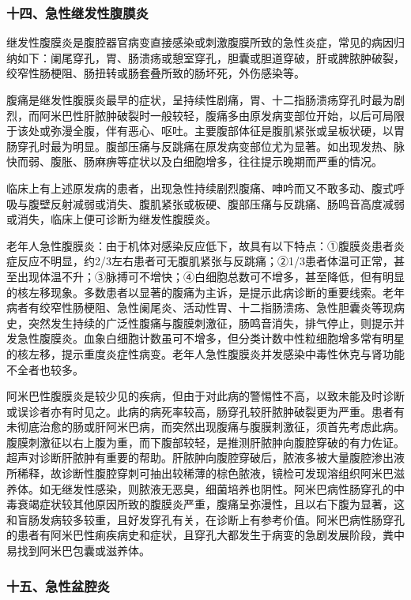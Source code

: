 \subsubsection{十四、急性继发性腹膜炎}

继发性腹膜炎是腹腔器官病变直接感染或刺激腹膜所致的急性炎症，常见的病因归纳如下：阑尾穿孔，胃、肠溃疡或憩室穿孔，胆囊或胆道穿破，肝或脾脓肿破裂，绞窄性肠梗阻、肠扭转或肠套叠所致的肠坏死，外伤感染等。

腹痛是继发性腹膜炎最早的症状，呈持续性剧痛，胃、十二指肠溃疡穿孔时最为剧烈，而阿米巴性肝脓肿破裂时一般较轻，腹痛多由原发病变部位开始，以后可局限于该处或弥漫全腹，伴有恶心、呕吐。主要腹部体征是腹肌紧张或呈板状硬，以胃肠穿孔时最为明显。腹部压痛与反跳痛在原发病变部位尤为显著。如出现发热、脉快而弱、腹胀、肠麻痹等症状以及白细胞增多，往往提示晚期而严重的情况。

临床上有上述原发病的患者，出现急性持续剧烈腹痛、呻吟而又不敢多动、腹式呼吸与腹壁反射减弱或消失、腹肌紧张或板硬、腹部压痛与反跳痛、肠鸣音高度减弱或消失，临床上便可诊断为继发性腹膜炎。

老年人急性腹膜炎：由于机体对感染反应低下，故具有以下特点：①腹膜炎患者炎症反应不明显，约2/3左右患者可无腹肌紧张与反跳痛；②1/3患者体温可正常，甚至出现体温不升；③脉搏可不增快；④白细胞总数可不增多，甚至降低，但有明显的核左移现象。多数患者以显著的腹痛为主诉，是提示此病诊断的重要线索。老年病者有绞窄性肠梗阻、急性阑尾炎、活动性胃、十二指肠溃疡、急性胆囊炎等现病史，突然发生持续的广泛性腹痛与腹膜刺激征，肠鸣音消失，排气停止，则提示并发急性腹膜炎。血象白细胞计数虽可不增多，但分类计数中性粒细胞增多常有明星的核左移，提示重度炎症性病变。老年人急性腹膜炎并发感染中毒性休克与肾功能不全者也较多。

阿米巴性腹膜炎是较少见的疾病，但由于对此病的警惕性不高，以致未能及时诊断或误诊者亦有时见之。此病的病死率较高，肠穿孔较肝脓肿破裂更为严重。患者有未彻底治愈的肠或肝阿米巴病，而突然出现腹痛与腹膜刺激征，须首先考虑此病。腹膜刺激征以右上腹为重，而下腹部较轻，是推测肝脓肿向腹腔穿破的有力佐证。超声对诊断肝脓肿有重要的帮助。肝脓肿向腹腔穿破后，脓液多被大量腹腔渗出液所稀释，故诊断性腹腔穿刺可抽出较稀薄的棕色脓液，镜检可发现溶组织阿米巴滋养体。如无继发性感染，则脓液无恶臭，细菌培养也阴性。阿米巴病性肠穿孔的中毒衰竭症状较其他原因所致的腹膜炎严重，腹痛呈弥漫性，且以右下腹为显著，这和盲肠发病较多较重，且好发穿孔有关，在诊断上有参考价值。阿米巴病性肠穿孔的患者有阿米巴性痢疾病史和症状，且穿孔大都发生于病变的急剧发展阶段，粪中易找到阿米巴包囊或滋养体。

\subsubsection{十五、急性盆腔炎}

